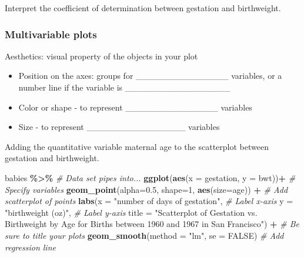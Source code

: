 \documentclass[
]{report}
\newenvironment{Shaded}{\begin{snugshade}}{\end{snugshade}}
\newcommand{\AttributeTok}[1]{\textcolor[rgb]{0.13,0.29,0.53}{#1}}
\newcommand{\CommentTok}[1]{\textcolor[rgb]{0.56,0.35,0.01}{\textit{#1}}}
\newcommand{\ConstantTok}[1]{\textcolor[rgb]{0.56,0.35,0.01}{#1}}
\newcommand{\DecValTok}[1]{\textcolor[rgb]{0.00,0.00,0.81}{#1}}
\newcommand{\FloatTok}[1]{\textcolor[rgb]{0.00,0.00,0.81}{#1}}
\newcommand{\FunctionTok}[1]{\textcolor[rgb]{0.13,0.29,0.53}{\textbf{#1}}}
\newcommand{\NormalTok}[1]{#1}
\newcommand{\SpecialCharTok}[1]{\textcolor[rgb]{0.81,0.36,0.00}{\textbf{#1}}}
\newcommand{\StringTok}[1]{\textcolor[rgb]{0.31,0.60,0.02}{#1}}
\begin{document}
\vspace{0.3in}

Interpret the coefficient of determination between gestation and birthweight.

\vspace{0.5in}

\newpage

\hypertarget{multivariable-plots}{%
\subsubsection*{Multivariable plots}\label{multivariable-plots}}

Aesthetics: visual property of the objects in your plot


\begin{itemize}
\item
  Position on the axes: groups for \_\_\_\_\_\_\_\_\_\_\_\_\_\_\_ variables, or a number line if the variable is \_\_\_\_\_\_\_\_\_\_\_\_\_\_\_\_\_
\item
  Color or shape - to represent \_\_\_\_\_\_\_\_\_\_\_\_\_\_\_ variables
\item
  Size - to represent \_\_\_\_\_\_\_\_\_\_\_\_\_\_\_\_ variables
\end{itemize}


Adding the quantitative variable maternal age to the scatterplot between gestation and birthweight.

\begin{Shaded}
\begin{Highlighting}[]
\NormalTok{babies }\SpecialCharTok{\%\textgreater{}\%} \CommentTok{\# Data set pipes into...}
\FunctionTok{ggplot}\NormalTok{(}\FunctionTok{aes}\NormalTok{(}\AttributeTok{x =}\NormalTok{ gestation, }\AttributeTok{y =}\NormalTok{ bwt))}\SpecialCharTok{+}  \CommentTok{\# Specify variables}
  \FunctionTok{geom\_point}\NormalTok{(}\AttributeTok{alpha=}\FloatTok{0.5}\NormalTok{, }\AttributeTok{shape=}\DecValTok{1}\NormalTok{, }\FunctionTok{aes}\NormalTok{(}\AttributeTok{size=}\NormalTok{age)) }\SpecialCharTok{+}  \CommentTok{\# Add scatterplot of points}
  \FunctionTok{labs}\NormalTok{(}\AttributeTok{x =} \StringTok{"number of days of gestation"}\NormalTok{,  }\CommentTok{\# Label x{-}axis}
       \AttributeTok{y =} \StringTok{"birthweight (oz)"}\NormalTok{,  }\CommentTok{\# Label y{-}axis}
       \AttributeTok{title =} \StringTok{"Scatterplot of Gestation vs. Birthweight by Age }
\StringTok{       for Births between 1960 and 1967 in San Francisco"}\NormalTok{) }\SpecialCharTok{+} 
    \CommentTok{\# Be sure to title your plots}
  \FunctionTok{geom\_smooth}\NormalTok{(}\AttributeTok{method =} \StringTok{"lm"}\NormalTok{, }\AttributeTok{se =} \ConstantTok{FALSE}\NormalTok{)  }\CommentTok{\# Add regression line}
\end{Highlighting}
\end{Shaded}
\end{document}

